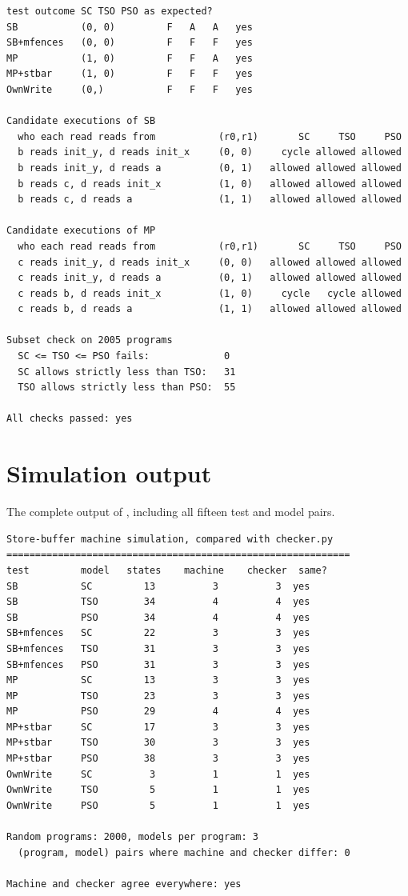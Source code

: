 \begin{lstlisting}[style=vscode,numbers=none,basicstyle=\ttfamily\scriptsize\color{vsfg}]
test outcome SC TSO PSO as expected?
SB           (0, 0)         F   A   A   yes
SB+mfences   (0, 0)         F   F   F   yes
MP           (1, 0)         F   F   A   yes
MP+stbar     (1, 0)         F   F   F   yes
OwnWrite     (0,)           F   F   F   yes

Candidate executions of SB
  who each read reads from           (r0,r1)       SC     TSO     PSO
  b reads init_y, d reads init_x     (0, 0)     cycle allowed allowed
  b reads init_y, d reads a          (0, 1)   allowed allowed allowed
  b reads c, d reads init_x          (1, 0)   allowed allowed allowed
  b reads c, d reads a               (1, 1)   allowed allowed allowed

Candidate executions of MP
  who each read reads from           (r0,r1)       SC     TSO     PSO
  c reads init_y, d reads init_x     (0, 0)   allowed allowed allowed
  c reads init_y, d reads a          (0, 1)   allowed allowed allowed
  c reads b, d reads init_x          (1, 0)     cycle   cycle allowed
  c reads b, d reads a               (1, 1)   allowed allowed allowed

Subset check on 2005 programs
  SC <= TSO <= PSO fails:             0
  SC allows strictly less than TSO:   31
  TSO allows strictly less than PSO:  55

All checks passed: yes
\end{lstlisting}

\section{Simulation output}
The complete output of , including all fifteen test and model pairs.

\begin{lstlisting}[style=vscode,numbers=none,basicstyle=\ttfamily\scriptsize\color{vsfg}]
Store-buffer machine simulation, compared with checker.py
============================================================
test         model   states    machine    checker  same?
SB           SC         13          3          3  yes
SB           TSO        34          4          4  yes
SB           PSO        34          4          4  yes
SB+mfences   SC         22          3          3  yes
SB+mfences   TSO        31          3          3  yes
SB+mfences   PSO        31          3          3  yes
MP           SC         13          3          3  yes
MP           TSO        23          3          3  yes
MP           PSO        29          4          4  yes
MP+stbar     SC         17          3          3  yes
MP+stbar     TSO        30          3          3  yes
MP+stbar     PSO        38          3          3  yes
OwnWrite     SC          3          1          1  yes
OwnWrite     TSO         5          1          1  yes
OwnWrite     PSO         5          1          1  yes

Random programs: 2000, models per program: 3
  (program, model) pairs where machine and checker differ: 0

Machine and checker agree everywhere: yes
\end{lstlisting}

